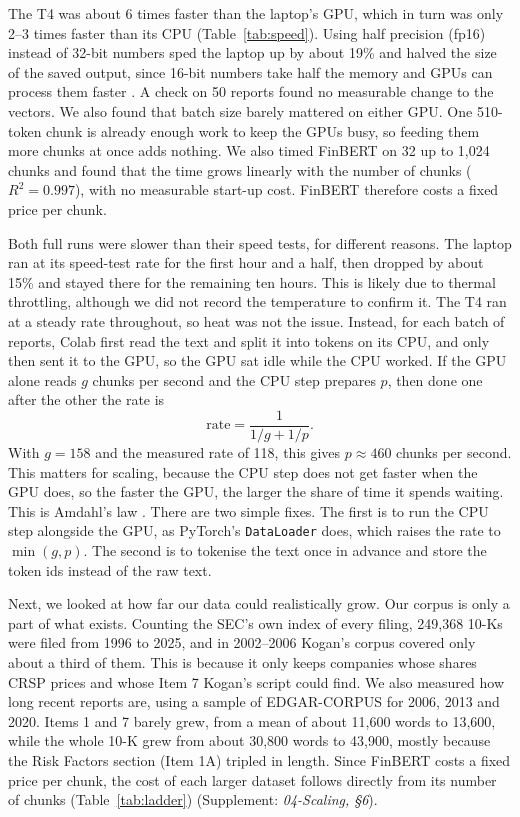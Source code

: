 \documentclass[11pt,a4paper]{article}
\newcommand{\supp}[1]{(Supplement: \textit{#1})}
\begin{document}
The T4 was about 6 times faster than the laptop's GPU, which in turn was only 2--3 times faster than its CPU (Table~\ref{tab:speed}). Using half precision (fp16) instead of 32-bit numbers sped the laptop up by about 19\% and halved the size of the saved output, since 16-bit numbers take half the memory and GPUs can process them faster \citep{micikevicius2018}. A check on 50 reports found no measurable change to the vectors. We also found that batch size barely mattered on either GPU. One 510-token chunk is already enough work to keep the GPUs busy, so feeding them more chunks at once adds nothing. We also timed FinBERT on 32 up to 1,024 chunks and found that the time grows linearly with the number of chunks ($R^2 = 0.997$), with no measurable start-up cost. FinBERT therefore costs a fixed price per chunk.

Both full runs were slower than their speed tests, for different reasons. The laptop ran at its speed-test rate for the first hour and a half, then dropped by about 15\% and stayed there for the remaining ten hours. This is likely due to thermal throttling, although we did not record the temperature to confirm it. The T4 ran at a steady rate throughout, so heat was not the issue. Instead, for each batch of reports, Colab first read the text and split it into tokens on its CPU, and only then sent it to the GPU, so the GPU sat idle while the CPU worked. If the GPU alone reads $g$ chunks per second and the CPU step prepares $p$, then done one after the other the rate is
\[
  \text{rate} = \frac{1}{1/g + 1/p}.
\]
With $g = 158$ and the measured rate of 118, this gives $p \approx 460$ chunks per second. This matters for scaling, because the CPU step does not get faster when the GPU does, so the faster the GPU, the larger the share of time it spends waiting. This is Amdahl's law \citep{amdahl1967,dst091}. There are two simple fixes. The first is to run the CPU step alongside the GPU, as PyTorch's \texttt{DataLoader} does, which raises the rate to $\min(g, p)$. The second is to tokenise the text once in advance and store the token ids instead of the raw text.

Next, we looked at how far our data could realistically grow. Our corpus is only a part of what exists. Counting the SEC's own index of every filing, 249,368 10-Ks were filed from 1996 to 2025, and in 2002--2006 Kogan's corpus covered only about a third of them. This is because it only keeps companies whose shares CRSP prices and whose Item 7 Kogan's script could find. We also measured how long recent reports are, using a sample of EDGAR-CORPUS \citep{loukas2021} for 2006, 2013 and 2020. Items 1 and 7 barely grew, from a mean of about 11,600 words to 13,600, while the whole 10-K grew from about 30,800 words to 43,900, mostly because the Risk Factors section (Item 1A) tripled in length. Since FinBERT costs a fixed price per chunk, the cost of each larger dataset follows directly from its number of chunks (Table~\ref{tab:ladder}) \supp{04-Scaling, \S6}.
\end{document}
